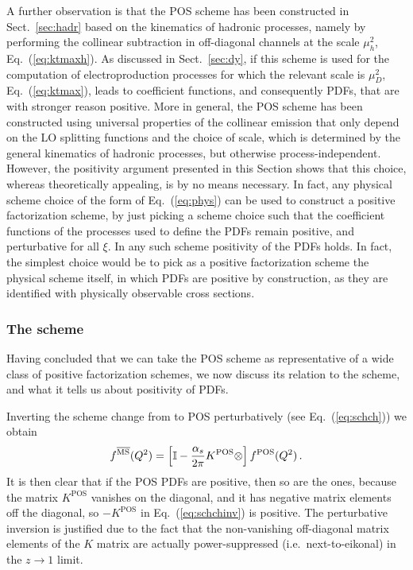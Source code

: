 A further observation is that the POS
scheme has been constructed in Sect.~\ref{sec:hadr} based on the kinematics of hadronic processes,
namely by performing the collinear subtraction in off-diagonal
channels at the scale  $\mu_h^2$,
Eq.~(\ref{eq:ktmaxh}). As discussed in Sect.~\ref{sec:dy}, if this
scheme is used for the computation of electroproduction processes for
which the relevant scale is $\mu_D^2$, Eq.~(\ref{eq:ktmax}), leads
to coefficient functions, and consequently PDFs, that are with stronger
reason positive. More in general, the POS scheme has been constructed
using universal properties of the collinear emission that only
depend on the LO splitting functions and the choice of scale, which is
determined by the general kinematics of hadronic processes, but
otherwise process-independent. However, the positivity argument
presented in this Section shows that this choice, whereas theoretically
appealing, is by no means necessary. In fact, any physical scheme
choice of the form of Eq.~(\ref{eq:phys}) can be used to construct a
positive factorization scheme, by just picking a scheme choice such
that the coefficient functions of the processes used to define the
PDFs remain positive, and perturbative for all $\xi$.
In any such scheme positivity of the PDFs
holds. In fact, the simplest choice would be to pick as a
positive factorization scheme the physical scheme itself, in which
PDFs are positive by construction, as they are identified with
physically observable cross sections.

\subsubsection{The \msbar{} scheme}
\label{sec:posmsbar}


Having concluded that we can take the POS scheme as representative of
a wide class of positive factorization schemes, we now discuss 
its relation to the \msbar{} scheme, and what it
tells us about positivity of \msbar{} PDFs.

Inverting the scheme change from \msbar{} to POS perturbatively (see Eq.~(\ref{eq:schch}))
we obtain
\begin{equation}
  \label{eq:schchinv}
 f^{{\overline{\textrm{{MS}}}}}(Q^2)=\left[\mathbb{I}
  -\frac{\alpha_s}{2\pi}  K^{\textrm{POS}}\otimes \right]  f^{\textrm{POS}}(Q^2) \,.
\end{equation}
It is then clear that if the POS PDFs are positive, then so are the
\msbar{} ones, because the matrix $K^{\textrm{POS}}$ vanishes on the
diagonal, and it has negative matrix elements off the diagonal, so
$-K^{\textrm{POS}}$ in Eq.~(\ref{eq:schchinv}) is positive.
The perturbative inversion is justified due to the fact that the
non-vanishing off-diagonal matrix elements of the $K$ matrix are
actually power-suppressed (i.e.\ next-to-eikonal) in the $z\to 1$
limit.

